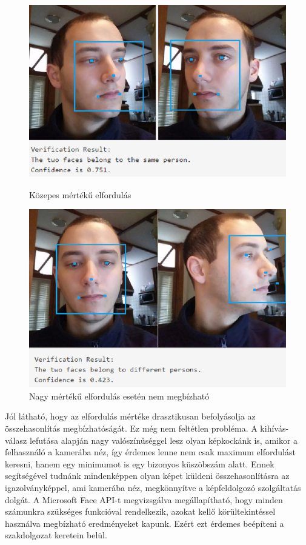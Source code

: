 \begin{figure}[h]
 \begin{minipage}{.5\textwidth} 
    \includegraphics[scale=0.3]{img/mpo_compare}
    \caption{Közepes mértékű elfordulás}
 \end{minipage}
 \begin{minipage}{.5\textwidth} 
     \includegraphics[scale=0.3]{img/mpo_compare_failed}
     \caption{Nagy mértékű elfordulás esetén nem megbízható}
 \end{minipage}
\end{figure}

Jól látható, hogy az elfordulás mértéke drasztikusan befolyásolja az összehasonlítás megbízhatóságát. Ez még nem feltétlen probléma. A kihívás-válasz lefutása alapján nagy valószínűséggel lesz olyan képkockánk is, amikor a felhasználó a kamerába néz, így érdemes lenne nem csak maximum elfordulást keresni, hanem egy minimumot is egy bizonyos küszöbszám alatt. Ennek segítségével tudnánk mindenképpen olyan képet küldeni összehasonlításra az igazolványképpel, ami kamerába néz, megkönnyítve a képfeldolgozó szolgáltatás dolgát.
A Microsoft Face API-t megvizsgálva megállapítható, hogy minden számunkra szükséges funkcióval rendelkezik, azokat kellő körültekintéssel használva megbízható eredményeket kapunk. Ezért ezt érdemes beépíteni a szakdolgozat keretein belül.

